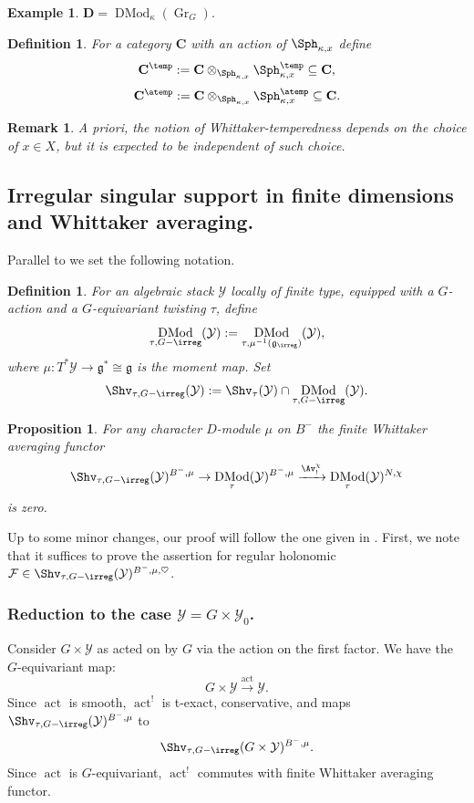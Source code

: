 \documentclass[9pt]{amsart}
\DeclareMathOperator{\Gra}{{Gr}}
\newcommand{\cF}{{\mathcal F}}
\newcommand{\cY}{{\mathcal Y}}
\newtheorem{pr}[subsubsection]{Proposition}
\newtheorem{df}[subsubsection]{Definition}
\newtheorem{rem}[subsubsection]{Remark}
\newtheorem{ex}[subsubsection]{Example}
\numberwithin{equation}{section}
\DeclareMathOperator{\D}{{DMod}}
\begin{document}
\begin{ex}
	$\mathbf{D} = \D_{\kappa}(\Gra_G)$.
\end{ex}

\begin{df}
	For a category $\mathbf{C}$ with an action of $\Sph_{\kappa, x}$ define $$\mathbf{C}^{\temp} := \mathbf{C} \otimes_{\Sph_{\kappa, x}} \Sph_{\kappa, x}^{\temp} \subseteq \mathbf{C},$$
	$$\mathbf{C}^{\atemp} := \mathbf{C} \otimes_{\Sph_{\kappa, x}} \Sph_{\kappa, x}^{\atemp} \subseteq \mathbf{C}.$$
\end{df}

\begin{rem}
	A priori, the notion of Whittaker-temperedness depends on the choice of $x \in X$, but it is expected to be independent of such choice. 
\end{rem}


\subsection{Irregular singular support in finite dimensions and Whittaker averaging.}

Parallel to \cite[3.1]{FR} we set the following notation.

\begin{df}
	For an algebraic stack $\cY$ locally of finite type, equipped with a $G$-action and a $G$-equivariant twisting $\tau$, define $$\D_{\tau, G-\irreg}(\cY) := \D_{\tau, \mu^{-1}(\mathfrak{g}_{\irreg})}(\cY),$$
	where $\mu: T^*\cY \rightarrow \mathfrak{g}^* \cong \mathfrak{g}$ is the moment map. 
	Set $$\Shv_{\tau, G-\irreg}(\cY):= \Shv_{\tau}(\cY) \cap \D_{\tau, G-\irreg}(\cY).$$
\end{df}

\begin{pr}\label{G-irreg zero}
	For any character $D$-module $\mu$ on $B^-$ the finite Whittaker averaging functor 
	$$\Shv_{\tau, G-\irreg}(\cY)^{B^-, \mu} \rightarrow \D_{\tau}(\cY)^{B^-, \mu} \xrightarrow{\Av_!^{\chi}} \D_{\tau}(\cY)^{N, \chi}$$
	is zero.
\end{pr}

Up to some minor changes, our proof will follow the one given in \cite[3.3]{FR}. First, we note that it suffices to prove the assertion for regular holonomic $\cF \in \Shv_{\tau, G-\irreg}(\cY)^{B^-, \mu, \heartsuit}$.
\subsubsection{Reduction to the case $\cY = G \times \cY_0$.} Consider $G \times \cY$  as acted on by $G$ via the action on the first factor. We have the $G$-equivariant map:
$$G \times \cY \xrightarrow{\operatorname{act}} \cY.$$
Since $\operatorname{act}$ is smooth, $\operatorname{act}^!$ is t-exact, conservative, and maps $\Shv_{\tau, G-\irreg}(\cY)^{B^-, \mu}$ to $$\Shv_{\tau, G-\irreg}(G \times \cY)^{B^-, \mu}.$$ Since $\operatorname{act}$ is $G$-equivariant, $\operatorname{act}^!$ commutes with finite Whittaker averaging functor. 
\end{document}

